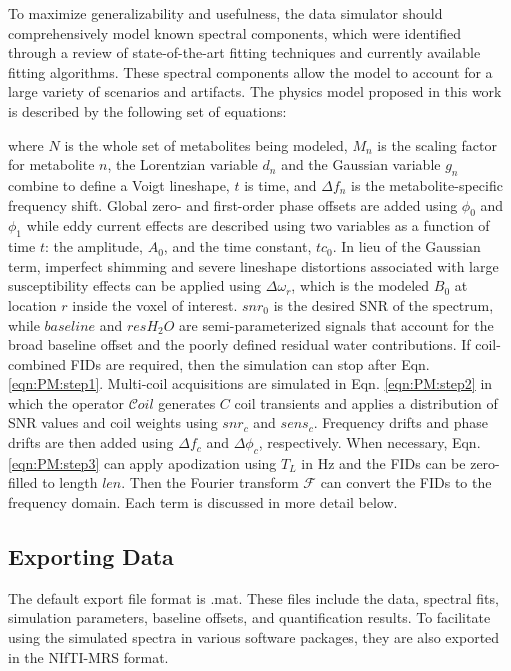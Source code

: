 To maximize generalizability and usefulness, the data simulator should comprehensively model known spectral components, which were identified through a review of state-of-the-art fitting techniques and currently available fitting algorithms. These spectral components allow the model to account for a large variety of scenarios and artifacts. The physics model proposed in this work is described by the following set of equations:

where $N$ is the whole set of metabolites being modeled, $M_n$ is the scaling factor for metabolite $n$, the Lorentzian variable $d_n$ and the Gaussian variable $g_n$ combine to define a Voigt lineshape, $t$ is time, and $\Delta f_n$ is the metabolite-specific frequency shift. Global zero- and first-order phase offsets are added using $\phi_0$ and $\phi_1$ while eddy current effects are described using two variables as a function of time $t$: the amplitude, $A_0$, and the time constant, $tc_0$. In lieu of the Gaussian term, imperfect shimming and severe lineshape distortions associated with large susceptibility effects can be applied using $\Delta\omega_r$, which is the modeled $B_0$ at location $r$ inside the voxel of interest. $snr_0$ is the desired SNR of the spectrum, while $baseline$ and $resH_2O$ are semi-parameterized signals that account for the broad baseline offset and the poorly defined residual water contributions. If coil-combined FIDs are required, then the simulation can stop after Eqn. \ref{eqn:PM:step1}. Multi-coil acquisitions are simulated in Eqn. \ref{eqn:PM:step2} in which the operator $\mathcal{C}oil$ generates $C$ coil transients and applies a distribution of SNR values and coil weights using $snr_c$ and $sens_c$. Frequency drifts and phase drifts are then added using $\Delta f_c$ and $\Delta \phi_c$, respectively. When necessary, Eqn. \ref{eqn:PM:step3} can apply apodization using $T_L$ in Hz and the FIDs can be zero-filled to length $len$. Then the Fourier transform $\mathcal{F}$ can convert the FIDs to the frequency domain. Each term is discussed in more detail below. 



\subsection{Exporting Data}\label{subsec:exporting data}
The default export file format is .mat. These files include the data, spectral fits, simulation parameters, baseline offsets, and quantification results. To facilitate using the simulated spectra in various software packages, they are also exported in the NIfTI-MRS format\cite{Clarke2022}.
 
